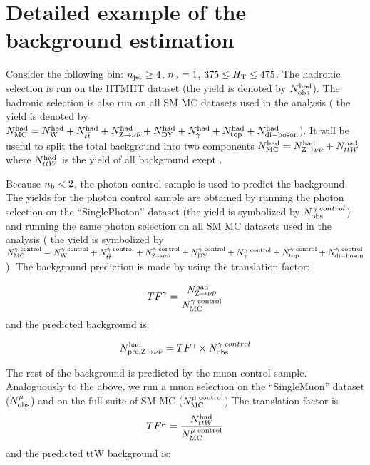 \clearpage
\section{Detailed example of the background estimation\label{app:bkg-example}}
Consider the following bin: $n_{\text{jet}} \ge 4$, $n_{\text{b}} = 1$, $ 375 \leq \mbox{$H_\text{T}$} \leq 475$.
The hadronic selection is run on the HTMHT dataset (the yield is denoted by $N_{\rm obs}^{\rm had}$).
The hadronic selection is also run on all SM MC datasets used in the analysis ( the yield is denoted by
$N_{\rm MC}^{\rm had} = N_{\rm W}^{\rm had} + N_{\relax{t}\overline{\relax{t}}}^{\rm had} + N_{{\text Z} \rightarrow \nu\bar{\nu}}^{\rm had} +
N_{\rm DY}^{\rm had} + N_{\gamma}^{\rm had} + N_{\rm top}^{\rm had} + N_{\rm di-boson}^{\rm had}$). 
It will be useful to split the total background into two components $N_{\rm MC}^{\rm had} = N_{{\text Z} \rightarrow \nu\bar{\nu}}^{\rm had} + N_{ttW}^{\rm had}$
where $N_{ttW}^{\rm had}$ is the yield of all background exept \znunu.  

Because $n_{\text{b}} < 2$, the photon control sample is used to predict the \znunu background. 
The yields for the photon control sample are obtained by running the photon selection on 
the ``SinglePhoton'' dataset (the yield is symbolized by ${N_{\textrm{obs}}^{\gamma\;control}}$) and 
running the same photon selection on all SM MC datasets used in the analysis (
the yield is symbolized by $N_{\rm MC}^{\rm \gamma\; control} = N_{\rm W}^{\rm \gamma\; control} + N_{\relax{t}\overline{\relax{t}}}^{\rm \gamma\; control} + N_{{\text Z} \rightarrow \nu\bar{\nu}}^{\rm \gamma\; control} +
N_{\rm DY}^{\rm \gamma\; control} + N_{\gamma}^{\rm \gamma\; control} + N_{\rm top}^{\rm \gamma\; control} + N_{\rm di-boson}^{\rm \gamma\; control}$). 
The background prediction is made by using the translation factor:

\begin{equation}
  \label{equ:ratio-denom}
  TF^{\gamma} = \frac{N_{{\text Z} \rightarrow \nu\bar{\nu}}^{\rm had}}{N_{\rm MC}^{\rm \gamma\; control}}
\end{equation}
%
and the predicted \znunu background is:

\begin{equation}
  \label{equ:pre-znunud}
  N_{\rm pre, \znunu}^{\rm had} = TF^{\gamma} \times {\nobs^{\gamma\;control}}
\end{equation}

The rest of the background is predicted by the muon control sample. Analoguously to the above, we run a 
muon selection on the ``SingleMuon'' dataset (${N_{\textrm{obs}}^\mu}$) and on the full suite of SM MC ($N_{\rm MC}^{\rm \mu\; control}$)
The translation factor is%
\begin{equation}
  \label{equ:ratio-denom2}
  TF^{\mu} = \frac{N_{ttW}^{\rm had}}{N_{\rm MC}^{\rm \mu\; control}}
\end{equation}
%
and the predicted ttW background is:

